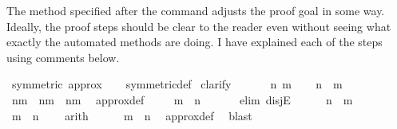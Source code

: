 \begin{isabellebody}
\begin{isamarkuptext}
The method specified after the command  adjusts the proof goal in some way. Ideally, the proof steps should be clear to the reader even without seeing what exactly the automated methods are doing. I have explained each of the steps using comments below.
\pagebreak%
\end{isamarkuptext}\isamarkuptrue%
%
\isadelimvisible
%
\endisadelimvisible
%
\isatagvisible
{}\isamarkupfalse%
\ {\isacartoucheopen}symmetric\ approx{\isacartoucheclose}\isanewline
\ \ \isamarkupfalse%
\ symmetric{\isacharunderscore}{\kern0pt}def\isanewline
{}\isamarkupfalse%
\ {\isacharparenleft}{\kern0pt}clarify{\isacharparenright}{\kern0pt}\isanewline
\ \ %
\isanewline
\ \ \isamarkupfalse%
\ n\ m\isanewline
\ \ \isamarkupfalse%
\ {\isacartoucheopen}n\ {\isasymapprox}\ m{\isacartoucheclose}\isanewline
\ \ %
\isanewline
\ \ \isamarkupfalse%
\ {\isacartoucheopen}n{\isacharequal}{\kern0pt}m{\isacharminus}{\kern0pt}{}\ {\isasymor}\ n{\isacharequal}{\kern0pt}m\ {\isasymor}\ n{\isacharequal}{\kern0pt}m{\isacharplus}{\kern0pt}{}{\isacartoucheclose}\ \isamarkupfalse%
\ approx{\isacharunderscore}{\kern0pt}def\ \isacommand{{\isachardot}{\kern0pt}}\isamarkupfalse%
\isanewline
\ \ \isamarkupfalse%
\ {\isacartoucheopen}m\ {\isasymapprox}\ n{\isacartoucheclose}\isanewline
\ \ %
\isanewline
\ \ \isamarkupfalse%
\ {\isacharparenleft}{\kern0pt}elim\ disjE{\isacharparenright}{\kern0pt}\isanewline
\ \ \ \ \isamarkupfalse%
\ {\isacartoucheopen}n\ {\isacharequal}{\kern0pt}\ m\ {\isacharminus}{\kern0pt}\ {}{\isacartoucheclose}\isanewline
\ \ \ \ \isamarkupfalse%
\ {\isacartoucheopen}m\ {\isacharequal}{\kern0pt}\ n\ {\isacharplus}{\kern0pt}\ {}{\isacartoucheclose}\ \isamarkupfalse%
\ arith\isanewline
\ \ \ \ \isamarkupfalse%
\ {\isacartoucheopen}m\ {\isasymapprox}\ n{\isacartoucheclose}\ \isamarkupfalse%
\ approx{\isacharunderscore}{\kern0pt}def\ \isamarkupfalse%
\ blast\isanewline
\ \ \isamarkupfalse%
\isanewline
\ \ \ \ \isamarkupfalse%

\end{isabellebody}
